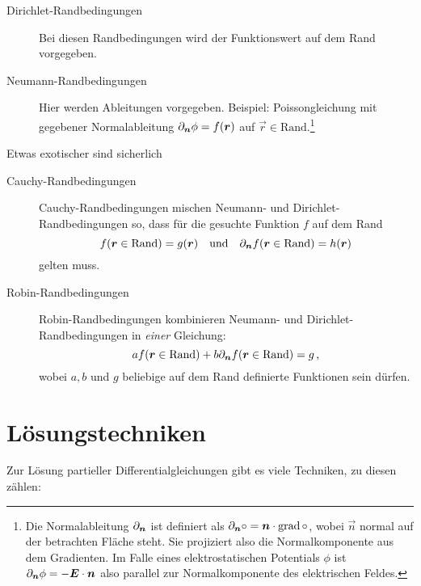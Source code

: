 \documentclass[paper=a4, fontsize=11.0pt, abstractoff, DIV12]{scrartcl}
\begin{document}
\begin{description}
    \item[Dirichlet-Randbedingungen]
    Bei diesen Randbedingungen wird der Funktionswert auf dem Rand vorgegeben.
    \item[Neumann-Randbedingungen]
    Hier werden Ableitungen vorgegeben. Beispiel: Poissongleichung mit gegebener
    Normalableitung $\partial_{{\boldsymbol{n}}} \phi = f({\boldsymbol{r}})$ auf $\vec r \in \text{Rand}$.\footnote{Die Normalableitung $\partial_{{\boldsymbol{n}}}$ ist definiert als $\partial_{{\boldsymbol{n}}} \circ = {\boldsymbol{n}} \cdot \operatorname{grad} \circ$, wobei $\vec n$ normal auf der betrachten Fläche steht.
    Sie projiziert also die Normalkomponente aus dem Gradienten. Im Falle eines
    elektrostatischen Potentials $\phi$ ist $\partial_{{\boldsymbol{n}}} \phi = -{\boldsymbol{E}} \cdot {\ensuremath{\boldsymbol{n}}}$
    also parallel zur Normalkomponente des elektrischen Feldes.}
\end{description}
Etwas exotischer sind sicherlich
\begin{description}
    \item[Cauchy-Randbedingungen]
    Cauchy-Randbedingungen mischen Neumann- und Dirichlet-Randbedingungen so,
    dass für die gesuchte Funktion $f$ auf dem Rand
    \[f({\boldsymbol{r}} \in \text{Rand}) = g({\boldsymbol{r}})\quad\text{und}\quad\partial_{{\boldsymbol{n}}} f({\boldsymbol{r}}\in \text{Rand}) = h({\boldsymbol{r}})\]
    gelten muss.
    \item[Robin-Randbedingungen]
    Robin-Randbedingungen kombinieren Neumann- und Dirichlet-Randbedingungen in
    \emph{einer} Gleichung:
    \[a f({\boldsymbol{r}} \in \text{Rand}) + b \partial_{{\boldsymbol{n}}} f({\boldsymbol{r}} \in \text{Rand}) = g\,,\]
    wobei $a, b$ und $g$ beliebige auf dem Rand definierte Funktionen sein dürfen.
    
\end{description}


\section{Lösungstechniken}

Zur Lösung partieller Differentialgleichungen gibt es viele Techniken, zu diesen zählen:
\end{document}
